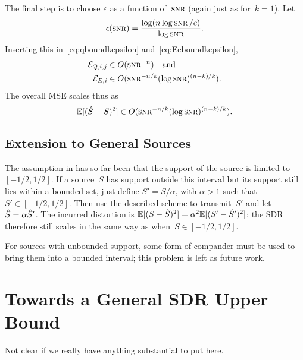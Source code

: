 The final step is to choose $\epsilon$ as a function of~$\snr$ (again just as
for~$k=1$). Let
\begin{equation*}
  \e(\snr) = \frac{\log(n \log\snr / c)}{\log\snr}.
\end{equation*}
Inserting this in~\eqref{eq:qboundkepsilon} and~\eqref{eq:Eeboundkepsilon}, 
\begin{align*}
  \Err_{Q,i,j} &\in O(\snr^{-n}) \quad\text{and} \\
  \Err_{E,i} &\in O(\snr^{-n/k} (\log\snr)^{(n-k)/k}).
\end{align*}
The overall MSE scales thus as
\begin{equation*}
  \mse \in O(\snr^{-n/k} (\log\snr)^{(n-k)/k}).
\end{equation*}


\subsection{Extension to General Sources}\label{sec:extgensources}

The assumption in  has so far been that the support of the
source is limited to~$[-1/2,1/2]$. If a source~$S$ has support outside this
interval but its support still lies within a bounded set, just define $S' =
S/\alpha$, with $\alpha > 1$ such that $S' \in [-1/2, 1/2]$. Then use
the described scheme to transmit~$S'$ and let ${\hat{S}} = \alpha {\hat{S}}'$. The
incurred distortion is $\mathbb{E}[(S - {\hat{S}})^2] = \alpha^2 \mathbb{E}[(S' - {\hat{S}}')^2]$; the SDR
therefore still scales in the same way as when~$S \in [-1/2, 1/2]$.

For sources with unbounded support, some form of compander must be used to bring
them into a bounded interval; this problem is left as future work. 





\section{Towards a General SDR Upper Bound}\label{sec:gensdrub}

\begin{notebox}
  Not clear if we really have anything substantial to put here.
\end{notebox}


